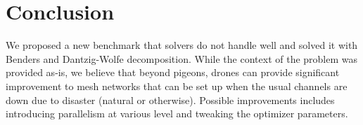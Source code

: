 \documentclass{article}
\begin{document}
\section{Conclusion}
We proposed a new benchmark that solvers do not handle well and solved it with Benders and Dantzig-Wolfe decomposition. While the context of the problem was provided as-is, we believe that beyond pigeons, drones can provide significant improvement to mesh networks that can be set up when the usual channels are down due to disaster (natural or otherwise). Possible improvements includes introducing parallelism at various level and tweaking the optimizer parameters.
\clearpage
\newpage
\printbibliography
\end{document}
